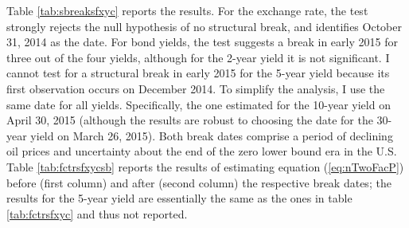 \documentclass[a4paper, 12pt]{article}
\providecommand{\breakdatefx}{October 31, 2014}
\providecommand{\breakdateyc}{April 30, 2015}
\begin{document}
Table \ref{tab:sbreaksfxyc} reports the results. For the exchange rate, the test strongly rejects the null hypothesis of no structural break, and identifies \breakdatefx{} as the date. For bond yields, the test suggests a break in early 2015 for three out of the four yields, although for the 2-year yield it is not significant. I cannot test for a structural break in early 2015 for the 5-year yield because its first observation occurs on December 2014. To simplify the analysis, I use the same date for all yields. Specifically, the one estimated for the 10-year yield on \breakdateyc{}  (although the results are robust to choosing the date for the 30-year yield on March 26, 2015). Both break dates comprise a period of declining oil prices and uncertainty about the end of the zero lower bound era in the U.S. Table \ref{tab:fctrsfxycsb} reports the results of estimating equation (\ref{eq:nTwoFacP}) before (first column) and after (second column) the respective break dates; the results for the 5-year yield are essentially the same as the ones in table \ref{tab:fctrsfxyc} and thus not reported. 
\end{document}
